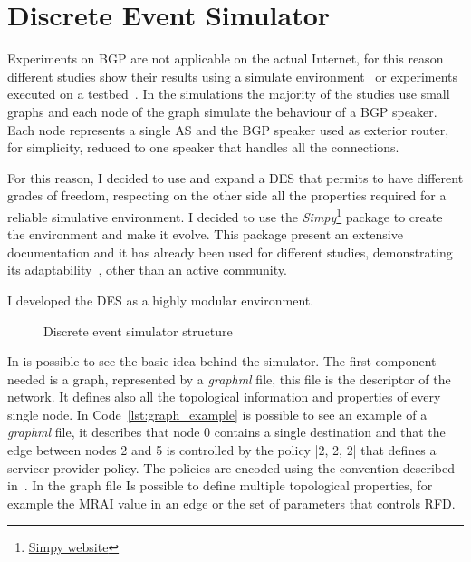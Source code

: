 \chapter{Discrete Event Simulator}
\label{cha:des}

Experiments on \ac{BGP} are not applicable on the actual Internet, for this
reason different studies show their results using a simulate environment~\cite{griffin2001experimental}
or experiments executed on a testbed~\cite{milani2020improving}.
In the simulations the majority of the studies use small graphs and each node
of the graph simulate the behaviour of a \ac{BGP} speaker.
Each node represents a single \ac{AS} and the \ac{BGP} speaker used as
exterior router, for simplicity, reduced to one speaker that handles all the
connections.

For this reason, I decided to use and expand a \ac{DES} that permits to have
different grades of freedom, respecting on the other side all the properties
required for a reliable simulative environment.
I decided to use the \textit{Simpy}\footnote{\href{https://simpy.readthedocs.io/en/latest/index.html}{Simpy website}}
package to create the environment and make it evolve.
This package present an extensive documentation and it has already been used for different
studies, demonstrating its adaptability~\cite{matloff2008introduction,dagkakis2013manpy},
other than an active community.

I developed the \ac{DES} as a highly modular environment.
\begin{figure}[h]
    \begin{center}
        
    \end{center}
    \caption{Discrete event simulator structure}
    \label{fig:des_structure}
\end{figure}

In  is possible to see the basic idea behind the simulator.
The first component needed is a graph, represented by a \textit{graphml} file,
this file is the descriptor of the network.
It defines also all the topological information and properties of every single node.
In Code~\ref{lst:graph_example} is possible to see an example of a \textit{graphml} file,
it describes that node \num{0} contains a single destination and that the edge
between nodes \num{2} and \num{5} is controlled by the policy |2, 2, 2| that defines
a servicer-provider policy.
The policies are encoded using the convention described in~\cite{daggitt2018rate}.
In the graph file Is possible to define multiple topological properties, for
example the \ac{MRAI} value in an edge or the set of parameters that
controls \ac{RFD}.


